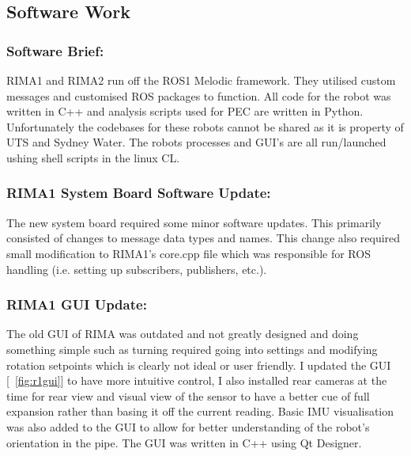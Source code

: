 \newpage
\subsection{Software Work}

\subsubsection{Software Brief: }
RIMA1 and RIMA2 run off the ROS1 Melodic framework. They utilised custom messages and customised ROS packages to function. All code for the robot was written in C++ and analysis scripts used for PEC are written
in Python. Unfortunately the codebases for these robots cannot be shared as it is property of UTS and Sydney Water. The robots processes and GUI's are all run/launched ushing shell scripts in the linux CL.

\vspace{\baselineskip}
\subsubsection{RIMA1 System Board Software Update: }
The new system board required some minor software updates. This primarily consisted of changes to message data types and names. This change also required small modification to RIMA1's core.cpp file which was responsible 
for ROS handling (i.e. setting up subscribers, publishers, etc.). 

\vspace{\baselineskip}
\subsubsection{RIMA1 GUI Update: }
The old GUI of RIMA was outdated and not greatly designed and doing something simple such as turning required going into settings and modifying rotation setpoints which is clearly not ideal or user friendly. I updated
the GUI [~\ref{fig:r1gui}] to have more intuitive control, I also installed rear cameras at the time for rear view and visual view of the sensor to have a better cue of full expansion rather than basing it off the current reading. Basic 
IMU visualisation was also added to the GUI to allow for better understanding of the robot's orientation in the pipe. The GUI was written in C++ using Qt Designer.

